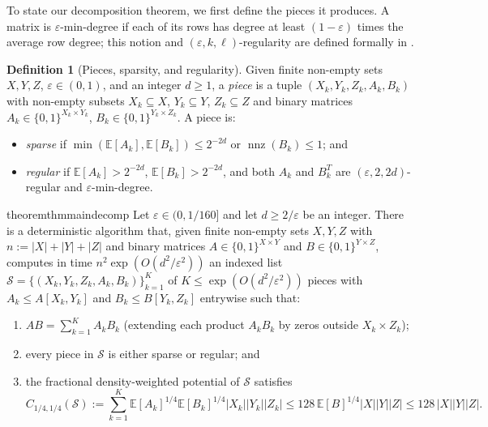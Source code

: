 \documentclass[11pt]{article}
\theoremstyle{definition}
\newtheorem{definition}{Definition}[section]
\renewcommand{\label}[1]{}%
\newcommand{\E}{\mathbb{E}}
\newcommand{\nnz}{\operatorname{nnz}}
\newcommand{\abs}[1]{\left\lvert #1 \right\rvert}
\newcommand{\dens}[1]{\E[#1]}
\newcommand{\pot}{C_{1/4,1/4}}
\begin{document}
To state our decomposition theorem, we first define the pieces it produces. A matrix is $\varepsilon$-min-degree if each of its rows has degree at least $(1 - \varepsilon)$ times the average row degree; this notion and $(\varepsilon, k, \ell)$-regularity are defined formally in .

\begin{definition}[Pieces, sparsity, and regularity]
\label{def:pieces}
Given finite non-empty sets $X, Y, Z$, $\varepsilon \in (0, 1)$, and an integer $d \ge 1$, a \emph{piece} is a tuple $(X_k, Y_k, Z_k, A_k, B_k)$ with non-empty subsets $X_k \subseteq X$, $Y_k \subseteq Y$, $Z_k \subseteq Z$ and binary matrices $A_k \in \{0, 1\}^{X_k \times Y_k}$, $B_k \in \{0, 1\}^{Y_k \times Z_k}$. A piece is:
\begin{itemize}[leftmargin=*]
    \item \emph{sparse} if $\min(\dens{A_k}, \dens{B_k}) \le 2^{-2d}$ or $\nnz(B_k) \le 1$; and
    \item \emph{regular} if $\dens{A_k} > 2^{-2d}$, $\dens{B_k} > 2^{-2d}$, and both $A_k$ and $B_k^T$ are $(\varepsilon, 2, 2d)$-regular and $\varepsilon$-min-degree.
\end{itemize}
\end{definition}

\begin{restatable}{theorem}{thmmaindecomp}\label{thm:main-decomp}
Let $\varepsilon \in (0, 1/160]$ and let $d \ge 2/\varepsilon$ be an integer. There is a deterministic algorithm that, given finite non-empty sets $X, Y, Z$ with $n := \abs{X} + \abs{Y} + \abs{Z}$ and binary matrices $A \in \{0, 1\}^{X \times Y}$ and $B \in \{0, 1\}^{Y \times Z}$, computes in time $n^2 \exp(O(d^2 / \varepsilon^2))$ an indexed list $\mathcal{S} = \{(X_k, Y_k, Z_k, A_k, B_k)\}_{k=1}^K$ of $K \le \exp(O(d^2 / \varepsilon^2))$ pieces with $A_k \le A[X_k, Y_k]$ and $B_k \le B[Y_k, Z_k]$ entrywise such that:
\begin{enumerate}[leftmargin=*]
    \item $AB = \sum_{k=1}^K A_k B_k$ (extending each product $A_k B_k$ by zeros outside $X_k \times Z_k$);
    \item every piece in $\mathcal{S}$ is either sparse or regular; and
    \item the fractional density-weighted potential of $\mathcal{S}$ satisfies
    \begin{equation}\label{eq:main-potential}
        \pot(\mathcal{S}) := \sum_{k=1}^K \dens{A_k}^{1/4}\dens{B_k}^{1/4}\abs{X_k}\abs{Y_k}\abs{Z_k} \le 128 \, \dens{B}^{1/4}\abs{X}\abs{Y}\abs{Z} \le 128 \, \abs{X}\abs{Y}\abs{Z}.
    \end{equation}
\end{enumerate}
\end{restatable}
\end{document}
